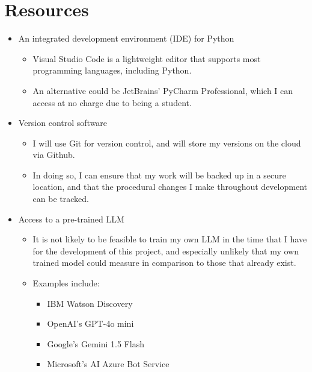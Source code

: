 \documentclass[12pt]{report}
\begin{document}
    \section{Resources}
    \begin{itemize}
        \item An integrated development environment (IDE) for Python
        \begin{itemize}
            \item Visual Studio Code is a lightweight editor that supports most programming languages,
            including Python.
            \item An alternative could be JetBrains' PyCharm Professional, which I can access at no charge due
            to being a student.
        \end{itemize}

        \item Version control software
        \begin{itemize}
            \item I will use Git for version control, and will store my versions on the cloud via Github. 
            \item In doing so, I can ensure that my work will be backed up in a secure location, and that the 
            procedural changes I make throughout development can be tracked.
        \end{itemize}

        \item Access to a pre-trained LLM
        \begin{itemize}
            \item It is not likely to be feasible to train my own LLM in the time that I have for the development 
            of this project, and especially unlikely that my own trained model could measure in comparison to those
            that already exist.
            \item Examples include:
            \begin{itemize}
                \item IBM Watson Discovery
                \item OpenAI's GPT-4o mini
                \item Google's Gemini 1.5 Flash
                \item Microsoft's AI Azure Bot Service
            \end{itemize} 
        \end{itemize}


\end{itemize}
\end{document}
